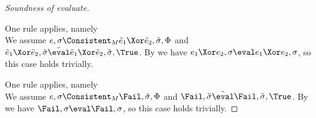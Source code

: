 \begin{proof}[Soundness of evaluate]
{    }

    {  One rule applies, namely \\
    We assume $e,\sigma\Consistent_M\tilde{e}_1\Xor \tilde{e}_2,\tilde{\sigma},\Phi$ and $\tilde{e}_1\Xor \tilde{e}_2,\tilde{\sigma}\tilde{\eval}\tilde{e}_1\Xor \tilde{e}_2,\tilde{\sigma},\True$.
    By  we have $e_1\Xor e_2,\sigma\eval e_1\Xor e_2,\sigma$, so this case holds trivially.

    }

    {  One rule applies, namely \\
    We assume $e,\sigma\Consistent_M\Fail,\tilde{\sigma},\Phi$ and $\Fail,\tilde{\sigma}\tilde{\eval}\Fail,\tilde{\sigma},\True$.
    By  we have $\Fail,\sigma\eval \Fail,\sigma$, so this case holds trivially.

    }

\end{proof}
